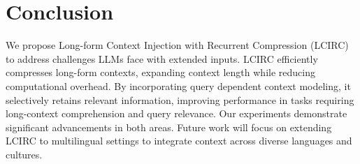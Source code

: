 \section{Conclusion}
We propose Long-form Context Injection with Recurrent Compression (LCIRC) to address challenges LLMs face with extended inputs. LCIRC efficiently compresses long-form contexts, expanding context length while reducing computational overhead. By incorporating query dependent context modeling, it selectively retains relevant information, improving performance in tasks requiring long-context comprehension and query relevance. Our experiments demonstrate significant advancements in both areas. Future work will focus on extending LCIRC to multilingual settings to integrate context across diverse languages and cultures.

